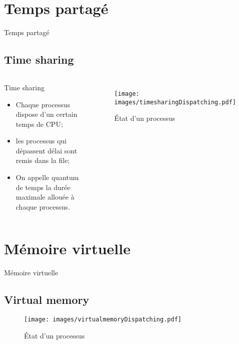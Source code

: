 \def\sectitle{Temps partagé}
\section{\sectitle}
\begin{frame}{\sectitle}
\def\subsectitle{Time sharing}
\subsection{\subsectitle}

\begin{columns}[c]
\begin{block}{\subsectitle}
\begin{itemize}
    \item Chaque processus dispose d'un certain temps de CPU;
    \item les processus qui dépassent délai sont remis dans la file;
    \item On appelle quantum de temps la durée maximale allouée à chaque
    processus.
\end{itemize}
\end{block}

\begin{figure}
\texttt{[image: images/timesharingDispatching.pdf]}
\caption{État d'un processus}
\end{figure}
\end{columns}

\end{frame}


\def\sectitle{Mémoire virtuelle}
\section{\sectitle}
\begin{frame}{\sectitle}
\def\subsectitle{Virtual memory}
\subsection{\subsectitle}

\begin{figure}
\texttt{[image: images/virtualmemoryDispatching.pdf]}
\caption{État d'un processus}
\end{figure}

\end{frame}





